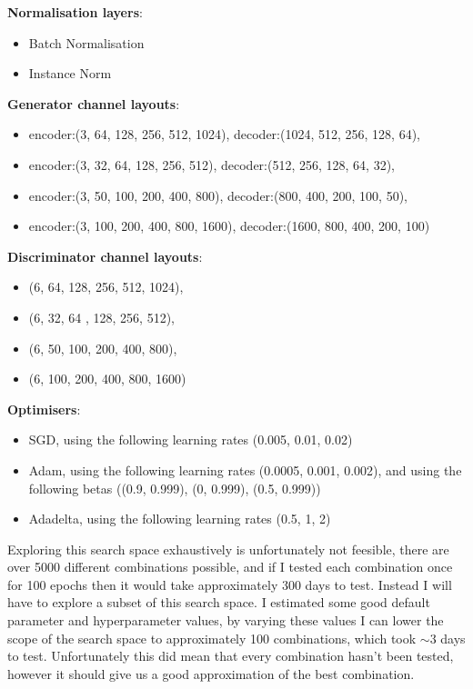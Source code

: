 \documentclass[11pt]{article}
\begin{document}
\textbf{Normalisation layers}: 
\begin{itemize}
\item Batch Normalisation
\item Instance Norm
\end{itemize}
\textbf{Generator channel layouts}:
\begin{itemize}
\item encoder:(3, 64, 128, 256, 512, 1024), decoder:(1024, 512, 256, 128, 64),
\item encoder:(3, 32, 64, 128, 256, 512), decoder:(512, 256, 128, 64, 32),
\item encoder:(3, 50, 100, 200, 400, 800), decoder:(800, 400, 200, 100, 50),
\item encoder:(3, 100, 200, 400, 800, 1600), decoder:(1600, 800, 400, 200, 100)
\end{itemize}
\textbf{Discriminator channel layouts}:
\begin{itemize}
\item (6, 64, 128, 256, 512, 1024),
\item (6, 32, 64 , 128, 256, 512),
\item (6, 50, 100, 200, 400, 800),
\item (6, 100, 200, 400, 800, 1600)
\end{itemize}
\textbf{Optimisers}:
\begin{itemize}
\item SGD, using the following learning rates (0.005, 0.01, 0.02)
\item Adam, using the following learning rates (0.0005, 0.001, 0.002), and using the following betas ((0.9, 0.999), (0, 0.999), (0.5, 0.999))
\item Adadelta, using the following learning rates (0.5, 1, 2)
\end{itemize}
Exploring this search space exhaustively is unfortunately not feesible, there are over 5000 different combinations possible, and if I tested each combination once for 100 epochs then it would take approximately 300 days to test.
Instead I will have to explore a subset of this search space. I estimated some good default parameter and hyperparameter values, by varying these values I can lower the scope of the search space to 
approximately 100 combinations, which took \(\sim\)3 days to test. Unfortunately this did mean that every combination hasn't been tested, however it should give us a good approximation of the best combination.
\end{document}
